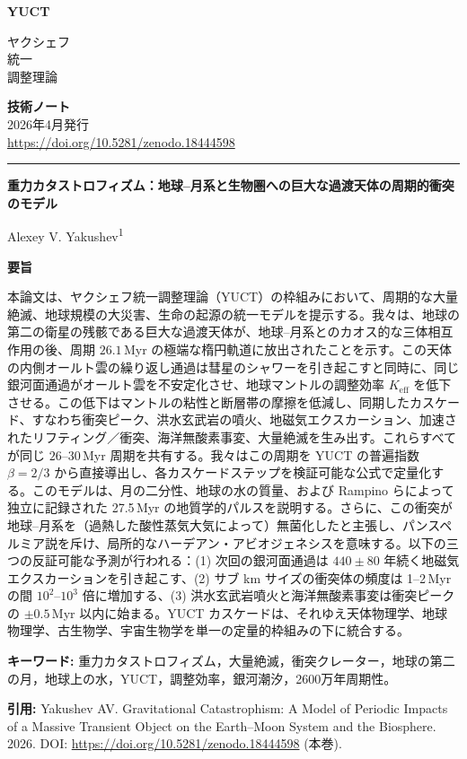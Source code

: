 \documentclass[12pt,a4paper]{article}
\newcommand{\makeheader}{%
	\noindent
	\begin{minipage}{0.17\textwidth}
		\raggedright
		{\sffamily\bfseries\color{skyblue}\fontsize{46}{46}\selectfont YUCT}%
	\end{minipage}%
	\hspace{30pt}
	\begin{minipage}{0.32\textwidth}
		\raggedright
		{\sffamily\fontsize{11}{13}\selectfont ヤクシェフ\\ 統一\\ 調整理論}%
	\end{minipage}%
	\hfill
	\begin{minipage}{0.38\textwidth}
		\raggedleft
		{\sffamily\bfseries 技術ノート}\\ 
		{\sffamily 2026年4月発行}\\ 
		{\sffamily\footnotesize \scriptsize\url{https://doi.org/10.5281/zenodo.18444598}}%
	\end{minipage}
	\par\vspace{5pt}
	\noindent\textcolor{gold}{\rule{\textwidth}{1.6pt}}
	\par\vspace{0pt}
}
\begin{document}
	\thispagestyle{firstpage}
	\makeheader
	
	\vspace{0cm}
	{\LARGE\bfseries 重力カタストロフィズム：地球–月系と生物圏への巨大な過渡天体の周期的衝突のモデル \par}
	\vspace{0.2cm}
	
	{\large Alexey V. Yakushev\textsuperscript{1}} \\
	\vspace{0.0cm}
	
	{\color{darkblue}\textbf{\LARGE 要旨}} \par
	{\large
		\noindent
		本論文は、ヤクシェフ統一調整理論（YUCT）の枠組みにおいて、周期的な大量絶滅、地球規模の大災害、生命の起源の統一モデルを提示する。我々は、地球の第二の衛星の残骸である巨大な過渡天体が、地球–月系とのカオス的な三体相互作用の後、周期 \(26.1\) Myr の極端な楕円軌道に放出されたことを示す。この天体の内側オールト雲の繰り返し通過は彗星のシャワーを引き起こすと同時に、同じ銀河面通過がオールト雲を不安定化させ、地球マントルの調整効率 \(K_{\mathrm{eff}}\) を低下させる。この低下はマントルの粘性と断層帯の摩擦を低減し、同期したカスケード、すなわち衝突ピーク、洪水玄武岩の噴火、地磁気エクスカーション、加速されたリフティング／衝突、海洋無酸素事変、大量絶滅を生み出す。これらすべてが同じ \(26\)–\(30\) Myr 周期を共有する。我々はこの周期を YUCT の普遍指数 \(\beta = 2/3\) から直接導出し、各カスケードステップを検証可能な公式で定量化する。このモデルは、月の二分性、地球の水の質量、および Rampino らによって独立に記録された 27.5 Myr の地質学的パルスを説明する。さらに、この衝突が地球–月系を（過熱した酸性蒸気大気によって）無菌化したと主張し、パンスペルミア説を斥け、局所的なハーデアン・アビオジェネシスを意味する。以下の三つの反証可能な予測が行われる：(1) 次回の銀河面通過は \(440 \pm 80\) 年続く地磁気エクスカーションを引き起こす、(2) サブ km サイズの衝突体の頻度は 1–2 Myr の間 \(10^{2}\)–\(10^{3}\) 倍に増加する、(3) 洪水玄武岩噴火と海洋無酸素事変は衝突ピークの \(\pm 0.5\) Myr 以内に始まる。YUCT カスケードは、それゆえ天体物理学、地球物理学、古生物学、宇宙生物学を単一の定量的枠組みの下に統合する。}
	
	\vspace{0.1cm}
	\noindent
	{\color{darkblue}\textbf{キーワード:}} 重力カタストロフィズム，大量絶滅，衝突クレーター，地球の第二の月，地球上の水，YUCT，調整効率，銀河潮汐，2600万年周期性。
	
	\vspace{0.1cm}
	\noindent
	{\color{darkblue}\textbf{引用:}} Yakushev AV. Gravitational Catastrophism: A Model of Periodic Impacts of a Massive Transient Object on the Earth–Moon System and the Biosphere. 2026. DOI: \url{https://doi.org/10.5281/zenodo.18444598} (本巻).
	
\end{document}
